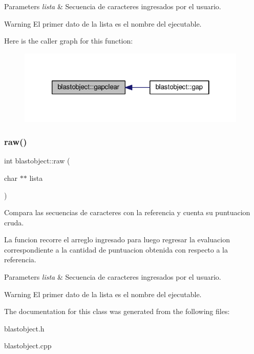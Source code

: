 \begin{DoxyParams}{Parameters}
{\em lista} & Secuencia de caracteres ingresados por el usuario. \\
\hline
\end{DoxyParams}
\begin{DoxyWarning}{Warning}
El primer dato de la lista es el nombre del ejecutable. 
\end{DoxyWarning}
Here is the caller graph for this function\+:
\nopagebreak
\begin{figure}[H]
\begin{center}
\leavevmode
\includegraphics[width=310pt]{classblastobject_a50f753f559096d95d75ee73ae08b846e_icgraph}
\end{center}
\end{figure}
\hypertarget{classblastobject_a0426c755487823aebf8734b19e668a49}{}\label{classblastobject_a0426c755487823aebf8734b19e668a49} 
\subsubsection{\texorpdfstring{raw()}{raw()}}
{\ttfamily int blastobject\+::raw (\begin{DoxyParamCaption}\item[{char $\ast$$\ast$}]{lista }\end{DoxyParamCaption})}



Compara las secuencias de caracteres con la referencia y cuenta su puntuacion cruda. 

La funcion recorre el arreglo ingresado para luego regresar la evaluacion correspondiente a la cantidad de puntuacion obtenida con respecto a la referencia.


\begin{DoxyParams}{Parameters}
{\em lista} & Secuencia de caracteres ingresados por el usuario. \\
\hline
\end{DoxyParams}
\begin{DoxyWarning}{Warning}
El primer dato de la lista es el nombre del ejecutable. 
\end{DoxyWarning}


The documentation for this class was generated from the following files\+:\begin{DoxyCompactItemize}
\item 
blastobject.\+h\item 
blastobject.\+cpp\end{DoxyCompactItemize}
